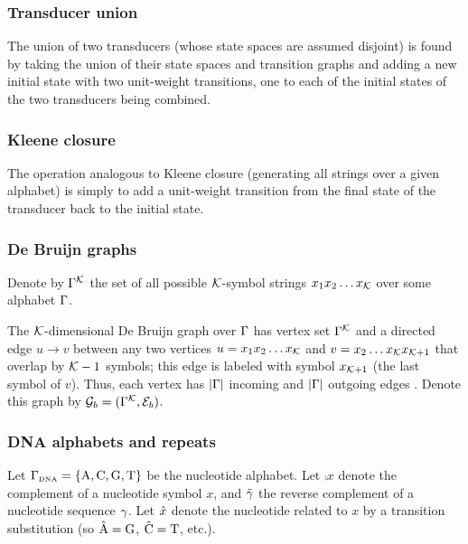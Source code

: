 \documentclass[english]{article}
\begin{document}
\subsubsection{Transducer union}

The union of two transducers (whose state spaces are assumed disjoint)
is found by taking the union of their state spaces and transition graphs
and adding a new initial state with two unit-weight transitions, one to each of the initial states
of the two transducers being combined.

\subsubsection{Kleene closure}

The operation analogous to Kleene closure (generating all strings over a given alphabet)
is simply to add a unit-weight transition from the final state of the transducer back to the initial state.

\subsubsection{De Bruijn graphs}

Denote by $\Gamma^{\cal K}$
the set of all possible ${\cal K}$-symbol strings
$x_1 x_2 \ldots x_{\cal K}$ over some alphabet $\Gamma$.

The ${\cal K}$-dimensional De Bruijn graph over $\Gamma$
has vertex set $\Gamma^{\cal K}$
and a directed edge $u \to v$ between any two vertices
$u=x_1 x_2 \ldots x_{\cal K}$ and $v=x_2 \ldots x_{\cal K} x_{{\cal K}+1}$
that overlap by ${\cal K}-1$ symbols; this edge is labeled with symbol $x_{{\cal K}+1}$ (the last symbol of $v$).
Thus, each vertex has $|\Gamma|$ incoming and $|\Gamma|$ outgoing edges \cite{DeBruijn1946,PevznerEtAl2001}.
Denote this graph by ${\cal G}_b = (\Gamma^{\cal K},{\cal E}_b)$.

\subsubsection{DNA alphabets and repeats}

Let $\Gamma_{\mbox{\tiny DNA}} = \{ \mbox{A}, \mbox{C}, \mbox{G}, \mbox{T} \} $ be the nucleotide alphabet.
Let $\comp{x}$ denote the complement of a nucleotide symbol $x$,
and $\tilde{\gamma}$ the reverse complement of a nucleotide sequence $\gamma$.
Let $\hat{x}$ denote the nucleotide related to $x$ by a transition substitution
(so $\hat{\mbox{A}} = \mbox{G}$, $\hat{\mbox{C}}=\mbox{T}$, etc.).
\end{document}
